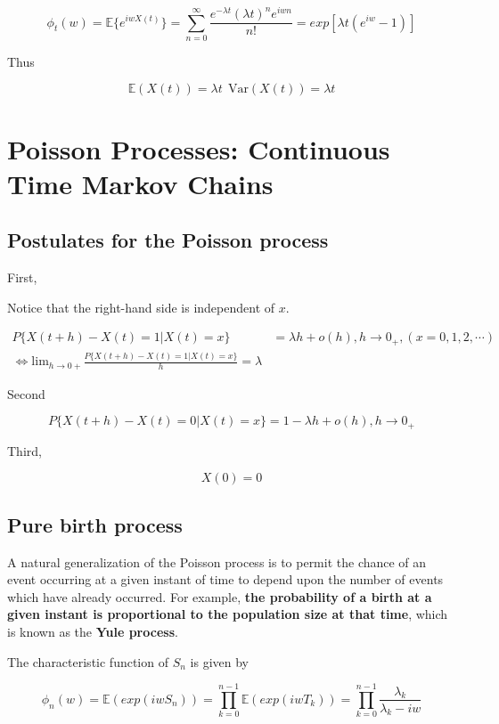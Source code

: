 \documentclass[12pt]{article}
\theoremstyle{nonumberbreak}
\begin{document}
$$
\phi_t (w) = \mathbb{E} \{ e^{iwX(t)} \} = \sum_{n=0}^\infty \frac{e^{-\lambda t} (\lambda t)^n e^{iwn}}{n!} = exp[\lambda t (e^{iw} -1)]
$$

Thus 

$$
\mathbb{E} (X(t)) = \lambda t \ \ \mathrm{Var}(X(t)) = \lambda t
$$


\section{Poisson Processes: Continuous Time Markov Chains}


\subsection{Postulates for the Poisson process}


First, 

Notice that the right-hand side is independent of $x$. 

$$
\begin{aligned}
P\{ X(t+h) - X(t) = 1 | X(t) = x \} &= \lambda h + o(h), h \to 0_+, (x=0,1,2,\cdots) \\[10pt]
\Leftrightarrow \mathrm{lim}_{h \to 0+} \frac{P\{ X(t+h) - X(t) = 1 | X(t) = x \}}{h} = \lambda
\end{aligned}
$$



Second


$$
P\{ X(t+h) - X(t) = 0 | X(t) = x \} = 1 - \lambda h + o(h), h \to 0_+
$$


Third,

$$
X(0) = 0 
$$


\subsection{Pure birth process}

A natural generalization of the Poisson process is to permit the chance of
an event occurring at a given instant of time to depend upon the number of events which have already occurred. For example, \textbf{the probability of a birth at a given instant is proportional to the population size at that time}, which is known as the \textbf{Yule process}.




The characteristic function of $S_n$ is given by

$$
\phi_n(w) = \mathbb{E}(exp(iwS_n)) = \prod_{k=0}^{n-1} \mathbb{E}(exp(iw T_k)) = \prod_{k=0}^{n-1} \frac{\lambda_k}{\lambda_k - iw}
$$
\end{document}
